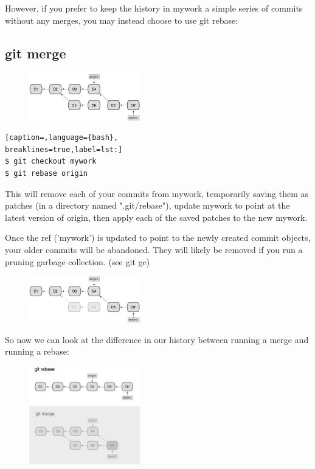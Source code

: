 However, if you prefer to keep the history in mywork a simple series of commits
without any merges, you may instead choose to use git rebase:

\subsection{git merge}
\begin{figure}[h]
\centering
\includegraphics[width=0.43\textwidth]{content/git/rebase3.png}
\end{figure}

\lstset{basicstyle=\scriptsize, numbers=none, captionpos=b, tabsize=4}
\begin{lstlisting}[caption=,language={bash},
breaklines=true,label=lst:]
$ git checkout mywork
$ git rebase origin
\end{lstlisting}

This will remove each of your commits from mywork, temporarily saving them as
patches (in a directory named ".git/rebase"), update mywork to point at the
latest version of origin, then apply each of the saved patches to the new
mywork.

Once the ref ('mywork') is updated to point to the newly created commit
objects, your older commits will be abandoned. They will likely be removed if
you run a pruning garbage collection. (see git gc)
\begin{figure}[h]
\centering
\includegraphics[width=0.43\textwidth]{content/git/rebase4.png}
\end{figure}

So now we can look at the difference in our history between running a merge and
running a rebase:
\begin{figure}[h]
\centering
\includegraphics[width=0.43\textwidth]{content/git/rebase5.png}
\end{figure}


